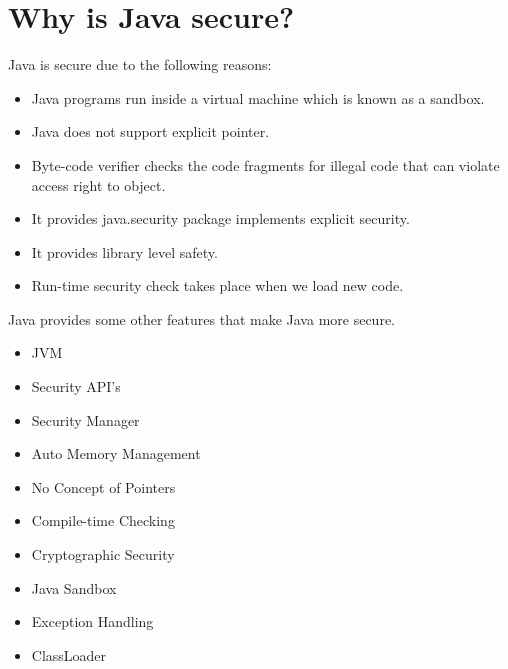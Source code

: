 \documentclass[twocolumn, a4paper]{article}
\begin{document}
\section{Why is Java secure?}
Java is secure due to the following reasons:
\begin{itemize}
  \item Java programs run inside a virtual machine which is known as a
    sandbox.
  \item Java does not support explicit pointer.
  \item Byte-code verifier checks the code fragments for illegal code that can
    violate access right to object.
  \item It provides java.security package implements explicit security.
  \item It provides library level safety.
  \item Run-time security check takes place when we load new code.
\end{itemize}
Java provides some other features that make Java more secure.

\begin{itemize}
  \item JVM
  \item Security API's
  \item Security Manager
  \item Auto Memory Management
  \item No Concept of Pointers
  \item Compile-time Checking
  \item Cryptographic Security
  \item Java Sandbox
  \item Exception Handling
  \item ClassLoader
\end{itemize}
\end{document}
